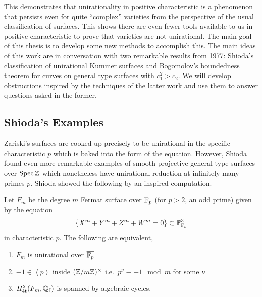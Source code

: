 \documentclass[main.tex]{subfiles}
\begin{document}
This demonstrates that unirationality in positive characteristic is a phenomenon that persists even for quite ``complex'' varieties from the perspective of the usual classification of surfaces. This shows there are even fewer tools available to us in positive characteristic to prove that varieties are not unirational. The main goal of this thesis is to develop some new methods to accomplish this. The main ideas of this work are in conversation with two remarkable results from 1977: Shioda's classification of unirational Kummer surfaces and Bogomolov's boundedness theorem for curves on general type surfaces with $c_1^2 > c_2$. We will develop obstructions inspired by the techniques of the latter work and use them to answer questions asked in the former.


\subsection{Shioda's Examples}

Zariski's surfaces are cooked up precisely to be unirational in the specific characteristic $p$ which is baked into the form of the equation. However, Shioda found even more remarkable examples of smooth projective general type surfaces over $\operatorname{\mathrm{Spec}}{\mathbb{Z}}$ which nonetheless have unirational reduction at infinitely many primes $p$. Shioda showed the following by an inspired computation.

\begin{theorem} \cite{shioda:fermat_1974, shioda-katsura:fermat_1979}
Let $F_m$ be the degree $m$ Fermat surface over $\mathbb{F}_p$ (for $p > 2$, an odd prime) given by the equation
\[ \{ X^m + Y^m + Z^m + W^m = 0 \} \subset \mathbb{P}^3_{\mathbb{F}_p} \]
in characteristic $p$. The following are equivalent,
\begin{enumerate}
\item $F_m$ is unirational over $\overline{\mathbb{F}_p}$
\item $-1 \in \left< p \right>$ inside $(\mathbb{Z} / m \mathbb{Z})^{\times}$ i.e.\ $p^\nu \equiv -1 \mod m$ for some $\nu$
\item $H^2_{\mathrm{\acute{e}t}}(F_m, \mathbb{Q}_{\ell})$ is spanned by algebraic cycles.
\end{enumerate}
\end{theorem}
\end{document}
